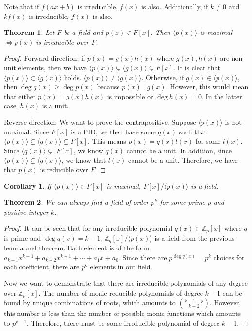 \documentclass{article}
\theoremstyle{definition}
\theoremstyle{plain}
\newtheorem{theorem}{Theorem}
\theoremstyle{corollary}
\newtheorem{corollary}{Corollary}
\theoremstyle{lemma}
\begin{document}
Note that if $f(ax+b)$ is irreducible, $f(x)$ is also. Additionally, if $k\neq0$ and $kf(x)$ is irreducible, $f(x)$ is also.

\begin{theorem}
    Let $F$ be a field and $p(x)\in F[x]$. Then $\langle p(x)\rangle$ is maximal $\iff p(x)$ is irreducible over $F$.
\end{theorem}

\begin{proof}
    Forward direction: if $p(x)=g(x)h(x)$ where $g(x),h(x)$ are non-unit elements, then we have $\langle p(x)\rangle\subsetneq\langle g(x)\rangle\subsetneq F[x]$. It is clear that $\langle p(x)\rangle\subset\langle g(x)\rangle$ holds. $\langle p(x)\rangle\neq\langle g(x)\rangle$. Otherwise, if $g(x)\in\langle p(x)\rangle$, then $\deg g(x)\geq\deg p(x)$ because $p(x)\mid g(x)$. However, this would mean that either $p(x)=g(x)h(x)$ is impossible or $\deg h(x)=0$. In the latter case, $h(x)$ is a unit.

    Reverse direction: We want to prove the contrapositive. Suppose $\langle p(x)\rangle$ is not maximal. Since $F[x]$ is a PID, we then have some $q(x)$ such that $\langle p(x)\rangle\subsetneq\langle q(x)\rangle\subsetneq F[x]$. This means $p(x)=q(x)l(x)$ for some $l(x)$. Since $\langle q(x)\rangle\subsetneq\ F[x]$, we know $q(x)$ cannot be a unit. In addition, since $\langle p(x)\rangle\subsetneq\langle q(x)\rangle$, we know that $l(x)$ cannot be a unit. Therefore, we have that $p(x)$ is reducible over $F$.
\end{proof}

\begin{corollary}
    If $\langle p(x)\rangle\in F[x]$ is maximal, $F[x]/\langle p(x)\rangle$ is a field.
\end{corollary}

\begin{theorem}
    We can always find a field of order $p^k$ for some prime $p$ and positive integer $k$.
\end{theorem}

\begin{proof}
    It can be seen that for any irreducible polynomial $q(x)\in\mathbb{Z}_p[x]$ where $q$ is prime and $\deg q(x)=k-1$, $\mathbb{Z}_q[x]/\langle p(x)\rangle$ is a field from the previous lemma and theorem. Each element is of the form $a_{k-1}x^{k-1}+a_{k-2}x^{k-1}+\cdots+a_1x+a_0$. Since there are $p^{\deg q(x)}=p^k$ choices for each coefficient, there are $p^k$ elements in our field.

    Now we want to demonstrate that there are irreducible polynomials of any degree over $\mathbb{Z}_p[x]$. The number of monic reducible polynomials of degree $k-1$ can be found by unique combinations of roots, which amounts to $\binom{k-1+p}{k-2}$. However, this number is less than the number of possible monic functions which amounts to $p^{k-1}$. Therefore, there must be some irreducible polynomial of degree $k-1$. 
\end{proof}
\end{document}
